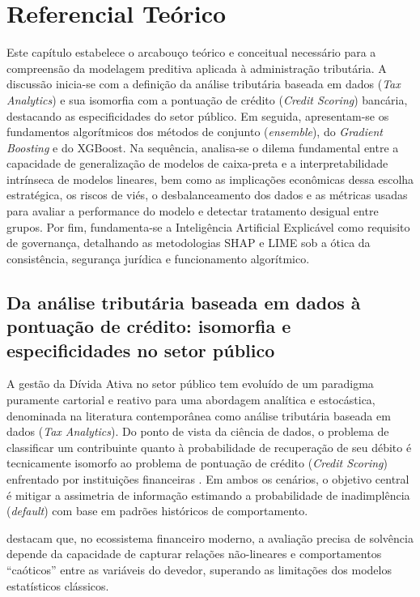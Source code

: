 \chapter{Referencial Teórico}
\label{cap:referencial_teorico}

Este capítulo estabelece o arcabouço teórico e conceitual necessário para a compreensão da modelagem preditiva aplicada à administração tributária. A discussão inicia-se com a definição da análise tributária baseada em dados (\textit{Tax Analytics}) e sua isomorfia com a pontuação de crédito (\textit{Credit Scoring}) bancária, destacando as especificidades do setor público. Em seguida, apresentam-se os fundamentos algorítmicos dos métodos de conjunto (\textit{ensemble}), do \textit{Gradient Boosting} e do XGBoost. Na sequência, analisa-se o dilema fundamental entre a capacidade de generalização de modelos de caixa-preta e a interpretabilidade intrínseca de modelos lineares, bem como as implicações econômicas dessa escolha estratégica, os riscos de viés, o desbalanceamento dos dados e as métricas usadas para avaliar a performance do modelo e detectar tratamento desigual entre grupos. Por fim, fundamenta-se a Inteligência Artificial Explicável como requisito de governança, detalhando as metodologias SHAP e LIME sob a ótica da consistência, segurança jurídica e funcionamento algorítmico.

\section{Da análise tributária baseada em dados à pontuação de crédito: isomorfia e especificidades no setor público}
\label{sec:tax_analytics}

A gestão da Dívida Ativa no setor público tem evoluído de um paradigma puramente cartorial e reativo para uma abordagem analítica e estocástica, denominada na literatura contemporânea como análise tributária baseada em dados (\textit{Tax Analytics}). Do ponto de vista da ciência de dados, o problema de classificar um contribuinte quanto à probabilidade de recuperação de seu débito é tecnicamente isomorfo ao problema de pontuação de crédito (\textit{Credit Scoring}) enfrentado por instituições financeiras \cite{changCreditRiskPrediction2024, noriegaMachineLearningCredit2023}. Em ambos os cenários, o objetivo central é mitigar a assimetria de informação estimando a probabilidade de inadimplência (\textit{default}) com base em padrões históricos de comportamento.

 destacam que, no ecossistema financeiro moderno, a avaliação precisa de solvência depende da capacidade de capturar relações não-lineares e comportamentos ``caóticos'' entre as variáveis do devedor, superando as limitações dos modelos estatísticos clássicos. 

